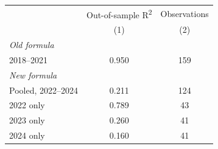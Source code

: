 \begin{table}[htbp]
\centering
\label{tab:pred_r2}
\begin{tabular}{lcc}
\toprule
 & Out-of-sample R\textsuperscript{2} & Observations \\
 & (1) & (2) \\
\midrule
\multicolumn{3}{l}{\textit{Old formula}} \\
2018--2021 & 0.950 & 159 \\
\midrule
\multicolumn{3}{l}{\textit{New formula}} \\
Pooled, 2022--2024 & 0.211 & 124 \\
2022 only & 0.789 & 43 \\
2023 only & 0.260 & 41 \\
2024 only & 0.160 & 41 \\
\bottomrule
\end{tabular}
\end{table}
